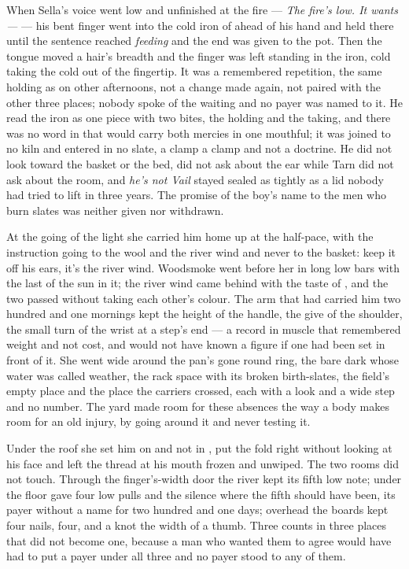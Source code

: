When Sella's voice went low and unfinished at the fire --- \emph{The fire's low. It wants---} --- his bent finger went into the cold iron of  ahead of his hand and held there until the sentence reached \emph{feeding} and the end was given to the pot. Then the tongue moved a hair's breadth and the finger was left standing in the iron, cold taking the cold out of the fingertip. It was a remembered repetition, the same holding as on other afternoons, not a change made again, not paired with the other three places; nobody spoke of the waiting and no payer was named to it. He read the iron as one piece with two bites, the holding and the taking, and there was no word in  that would carry both mercies in one mouthful; it was joined to no kiln and entered in no slate, a clamp a clamp and not a doctrine. He did not look toward the basket or the bed, did not ask about the ear while Tarn did not ask about the room, and \emph{he's not Vail} stayed sealed as tightly as a lid nobody had tried to lift in three years. The promise of the boy's name to the men who burn slates was neither given nor withdrawn.

\scenebreak

At the going of the light she carried him home up  at the half-pace, with the instruction going to the wool and the river wind and never to the basket: keep it off his ears, it's the river wind. Woodsmoke went before her in long low bars with the last of the sun in it; the river wind came behind with the taste of , and the two passed without taking each other's colour. The arm that had carried him two hundred and one mornings kept the height of the handle, the give of the shoulder, the small turn of the wrist at a step's end --- a record in muscle that remembered weight and not cost, and would not have known a figure if one had been set in front of it. She went wide around the pan's gone round ring, the bare dark  whose water was called weather, the rack space with its broken birth-slates, the field's empty place and the place the carriers crossed, each with a look and a wide step and no number. The yard made room for these absences the way a body makes room for an old injury, by going around it and never testing it.

Under the roof she set him on  and not in , put the fold right without looking at his face and left the thread at his mouth frozen and unwiped. The two rooms did not touch. Through the finger's-width door the river kept its fifth low note; under the floor  gave four low pulls and the silence where the fifth should have been, its payer without a name for two hundred and one days; overhead the boards kept four nails, four, and a knot the width of a thumb. Three counts in three places that did not become one, because a man who wanted them to agree would have had to put a payer under all three and no payer stood to any of them.

